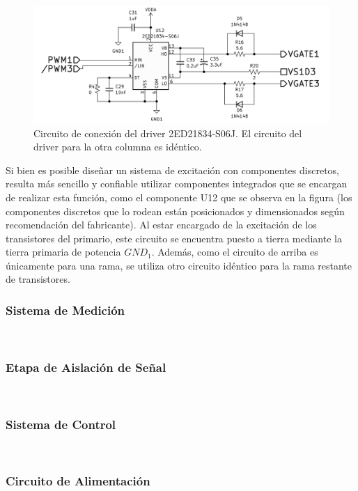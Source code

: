 \begin{figure}[h]
    \centering
    \includegraphics[scale=0.95]{Imagenes/Circuito Driver.png}
    \caption{Circuito de conexión del driver 2ED21834-S06J. El circuito del driver para la otra columna es idéntico.}
    \label{fig:driver}
\end{figure}

Si bien es posible diseñar un sistema de excitación con componentes discretos, resulta más sencillo y confiable utilizar componentes integrados que se encargan de realizar esta función, como el componente U12 que se observa en la figura (los componentes discretos que lo rodean están posicionados y dimensionados según recomendación del fabricante). Al estar encargado de la excitación de los transistores del primario, este circuito se encuentra puesto a tierra mediante la tierra primaria de potencia $GND_1$. Además, como el circuito de arriba es únicamente para una rama, se utiliza otro circuito idéntico para la rama restante de transistores.\\

\subsubsection{Sistema de Medición}

\lipsum[3]\\

\subsubsection{Etapa de Aislación de Señal}

\lipsum[4]\\

\subsubsection{Sistema de Control}

\lipsum[5]\\

\subsubsection{Circuito de Alimentación}

\lipsum[6]\\